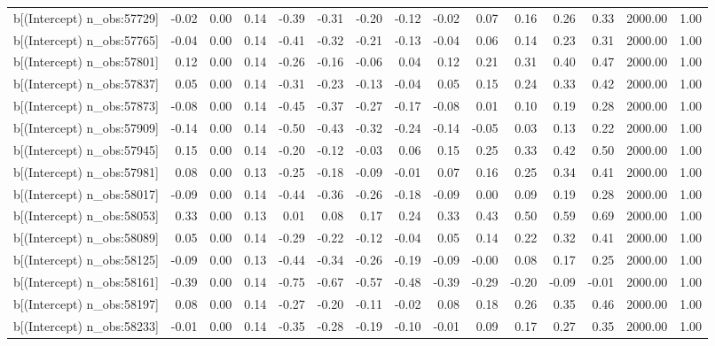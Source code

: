 \begin{table}[ht]
\begin{tabular}{rrrrrrrrrrrrrrr}
  b[(Intercept) n\_obs:57729] & -0.02 & 0.00 & 0.14 & -0.39 & -0.31 & -0.20 & -0.12 & -0.02 & 0.07 & 0.16 & 0.26 & 0.33 & 2000.00 & 1.00 \\ 
  b[(Intercept) n\_obs:57765] & -0.04 & 0.00 & 0.14 & -0.41 & -0.32 & -0.21 & -0.13 & -0.04 & 0.06 & 0.14 & 0.23 & 0.31 & 2000.00 & 1.00 \\ 
  b[(Intercept) n\_obs:57801] & 0.12 & 0.00 & 0.14 & -0.26 & -0.16 & -0.06 & 0.04 & 0.12 & 0.21 & 0.31 & 0.40 & 0.47 & 2000.00 & 1.00 \\ 
  b[(Intercept) n\_obs:57837] & 0.05 & 0.00 & 0.14 & -0.31 & -0.23 & -0.13 & -0.04 & 0.05 & 0.15 & 0.24 & 0.33 & 0.42 & 2000.00 & 1.00 \\ 
  b[(Intercept) n\_obs:57873] & -0.08 & 0.00 & 0.14 & -0.45 & -0.37 & -0.27 & -0.17 & -0.08 & 0.01 & 0.10 & 0.19 & 0.28 & 2000.00 & 1.00 \\ 
  b[(Intercept) n\_obs:57909] & -0.14 & 0.00 & 0.14 & -0.50 & -0.43 & -0.32 & -0.24 & -0.14 & -0.05 & 0.03 & 0.13 & 0.22 & 2000.00 & 1.00 \\ 
  b[(Intercept) n\_obs:57945] & 0.15 & 0.00 & 0.14 & -0.20 & -0.12 & -0.03 & 0.06 & 0.15 & 0.25 & 0.33 & 0.42 & 0.50 & 2000.00 & 1.00 \\ 
  b[(Intercept) n\_obs:57981] & 0.08 & 0.00 & 0.13 & -0.25 & -0.18 & -0.09 & -0.01 & 0.07 & 0.16 & 0.25 & 0.34 & 0.41 & 2000.00 & 1.00 \\ 
  b[(Intercept) n\_obs:58017] & -0.09 & 0.00 & 0.14 & -0.44 & -0.36 & -0.26 & -0.18 & -0.09 & 0.00 & 0.09 & 0.19 & 0.28 & 2000.00 & 1.00 \\ 
  b[(Intercept) n\_obs:58053] & 0.33 & 0.00 & 0.13 & 0.01 & 0.08 & 0.17 & 0.24 & 0.33 & 0.43 & 0.50 & 0.59 & 0.69 & 2000.00 & 1.00 \\ 
  b[(Intercept) n\_obs:58089] & 0.05 & 0.00 & 0.14 & -0.29 & -0.22 & -0.12 & -0.04 & 0.05 & 0.14 & 0.22 & 0.32 & 0.41 & 2000.00 & 1.00 \\ 
  b[(Intercept) n\_obs:58125] & -0.09 & 0.00 & 0.13 & -0.44 & -0.34 & -0.26 & -0.19 & -0.09 & -0.00 & 0.08 & 0.17 & 0.25 & 2000.00 & 1.00 \\ 
  b[(Intercept) n\_obs:58161] & -0.39 & 0.00 & 0.14 & -0.75 & -0.67 & -0.57 & -0.48 & -0.39 & -0.29 & -0.20 & -0.09 & -0.01 & 2000.00 & 1.00 \\ 
  b[(Intercept) n\_obs:58197] & 0.08 & 0.00 & 0.14 & -0.27 & -0.20 & -0.11 & -0.02 & 0.08 & 0.18 & 0.26 & 0.35 & 0.46 & 2000.00 & 1.00 \\ 
  b[(Intercept) n\_obs:58233] & -0.01 & 0.00 & 0.14 & -0.35 & -0.28 & -0.19 & -0.10 & -0.01 & 0.09 & 0.17 & 0.27 & 0.35 & 2000.00 & 1.00 \\ 

\end{tabular}
\end{table}
